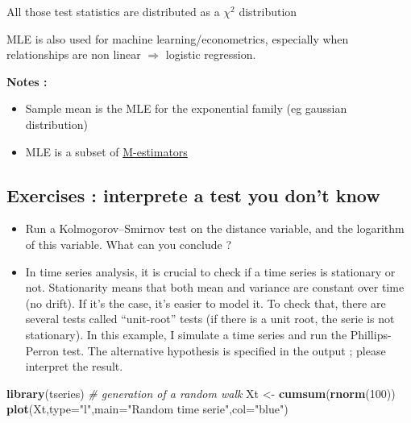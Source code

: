 \documentclass[
]{book}
\newenvironment{Shaded}{\begin{snugshade}}{\end{snugshade}}
\newcommand{\CommentTok}[1]{\textcolor[rgb]{0.56,0.35,0.01}{\textit{#1}}}
\newcommand{\DataTypeTok}[1]{\textcolor[rgb]{0.13,0.29,0.53}{#1}}
\newcommand{\DecValTok}[1]{\textcolor[rgb]{0.00,0.00,0.81}{#1}}
\newcommand{\KeywordTok}[1]{\textcolor[rgb]{0.13,0.29,0.53}{\textbf{#1}}}
\newcommand{\NormalTok}[1]{#1}
\newcommand{\StringTok}[1]{\textcolor[rgb]{0.31,0.60,0.02}{#1}}
\providecommand{\tightlist}{%
  \setlength{\itemsep}{0pt}\setlength{\parskip}{0pt}}
\begin{document}
All those test statistics are distributed as a \(\chi^2\) distribution

MLE is also used for machine learning/econometrics, especially when relationships are non linear \(\Rightarrow\) logistic regression.

\textbf{Notes :}

\begin{itemize}
\tightlist
\item
  Sample mean is the MLE for the exponential family (eg gaussian distribution)
\item
  MLE is a subset of \href{https://en.wikipedia.org/wiki/M-estimator}{M-estimators}
\end{itemize}

\hypertarget{exercises-interprete-a-test-you-dont-know}{%
\subsection{Exercises : interprete a test you don't know}\label{exercises-interprete-a-test-you-dont-know}}

\begin{itemize}
\tightlist
\item
  Run a Kolmogorov--Smirnov test on the distance variable, and the logarithm of this variable. What can you conclude ?
\item
  In time series analysis, it is crucial to check if a time series is stationary or not. Stationarity means that both mean and variance are constant over time (no drift). If it's the case, it's easier to model it.
  To check that, there are several tests called ``unit-root'' tests (if there is a unit root, the serie is not stationary).
  In this example, I simulate a time series and run the Phillips-Perron test. The alternative hypothesis is specified in the output ; please interpret the result.
\end{itemize}

\begin{Shaded}
\begin{Highlighting}[]
\KeywordTok{library}\NormalTok{(tseries)}
\CommentTok{# generation of a random walk}
\NormalTok{Xt <-}\StringTok{ }\KeywordTok{cumsum}\NormalTok{(}\KeywordTok{rnorm}\NormalTok{(}\DecValTok{100}\NormalTok{))}
\KeywordTok{plot}\NormalTok{(Xt,}\DataTypeTok{type=}\StringTok{"l"}\NormalTok{,}\DataTypeTok{main=}\StringTok{"Random time serie"}\NormalTok{,}\DataTypeTok{col=}\StringTok{"blue"}\NormalTok{)}
\end{Highlighting}
\end{Shaded}
\end{document}
